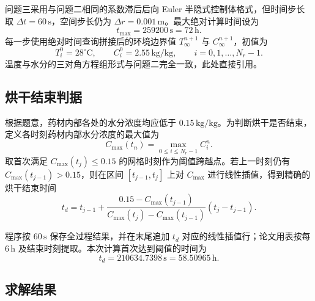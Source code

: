 \documentclass[withoutpreface,bwprint]{cumcm_thesis}
\begin{document}
问题三采用与问题二相同的系数滞后后向 Euler 半隐式控制体格式，但时间步长取 \(\Delta t = 60\,\text{s}\)，空间步长仍为 \(\Delta r = 0.001\,\text{m}\)。最大绝对计算时间设为
\begin{equation}
t_{\max} = 259200\,\text{s} = 72\,\text{h}.
\end{equation}
每一步使用绝对时间查询拼接后的环境边界值 \(T_\infty^{n+1}\) 与 \(C_\infty^{n+1}\)，初值为
\begin{equation}
T_i^0 = 28^\circ\text{C}, \qquad C_i^0 = 2.55\,\text{kg/kg}, \qquad i = 0,1,\dots,N_r-1.
\end{equation}
温度与水分的三对角方程组形式与问题二完全一致，此处直接引用。

\subsection{烘干结束判据}

根据题意，药材内部各处的水分浓度均应低于 \(0.15\,\text{kg/kg}\)。为判断烘干是否结束，定义各时刻药材内部水分浓度的最大值为
\begin{equation}
C_{\max}(t_n) = \max_{0 \le i \le N_r-1} C_i^n.
\end{equation}
取首次满足 \(C_{\max}(t_j) \le 0.15\) 的网格时刻作为阈值跨越点。若上一时刻仍有 \(C_{\max}(t_{j-1}) > 0.15\)，则在区间 \([t_{j-1}, t_j]\) 上对 \(C_{\max}\) 进行线性插值，得到精确的烘干结束时间
\begin{equation}
t_d = t_{j-1} + \frac{0.15 - C_{\max}(t_{j-1})}{C_{\max}(t_j) - C_{\max}(t_{j-1})} (t_j - t_{j-1}).
\end{equation}

程序按 \(60\,\text{s}\) 保存全过程结果，并在末尾追加 \(t_d\) 对应的线性插值行；论文用表按每 \(6\,\text{h}\) 及结束时刻提取。本次计算首次达到阈值的时间为
\begin{equation}
t_d = 210634.7398\,\text{s} = 58.50965\,\text{h}.
\end{equation}

\subsection{求解结果}
\end{document}
